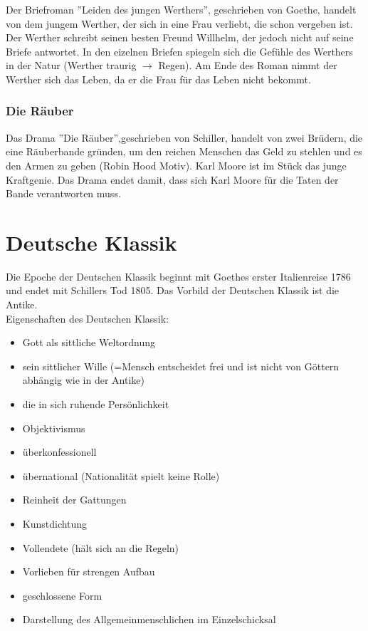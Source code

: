 \documentclass[12pt,a4paper]{article}
\begin{document}
Der Briefroman ''Leiden des jungen Werthers'', geschrieben von Goethe, handelt von dem jungem Werther, der sich in eine Frau verliebt, die schon vergeben ist. Der Werther schreibt seinen besten Freund Willhelm, der jedoch nicht auf seine Briefe antwortet. In den eizelnen Briefen spiegeln sich die Gefühle des Werthers in der Natur (Werther traurig $\rightarrow$ Regen). Am Ende des Roman nimmt der Werther sich das Leben, da er die Frau für das Leben nicht bekommt.

\subsubsection{Die Räuber}

Das Drama ''Die Räuber'',geschrieben von Schiller, handelt von zwei Brüdern, die eine Räuberbande gründen, um den reichen Menschen das Geld zu stehlen und es den Armen zu geben (Robin Hood Motiv). Karl Moore ist im Stück das junge Kraftgenie. Das Drama endet damit, dass sich Karl Moore für die Taten der Bande verantworten muss.

\newpage

\section{Deutsche Klassik}

Die Epoche der Deutschen Klassik beginnt mit Goethes erster Italienreise 1786 und endet mit Schillers Tod 1805. Das Vorbild der
Deutschen Klassik ist die Antike.\\

Eigenschaften des Deutschen Klassik:

\begin{itemize}
\item Gott als sittliche Weltordnung
\item sein sittlicher Wille (=Mensch entscheidet frei und ist nicht von Göttern abhängig wie in der Antike)
\item die in sich ruhende Persönlichkeit
\item Objektivismus
\item überkonfessionell
\item übernational (Nationalität spielt keine Rolle)
\item Reinheit der Gattungen
\item Kunstdichtung
\item Vollendete (hält sich an die Regeln)
\item Vorlieben für strengen Aufbau
\item geschlossene Form
\item Darstellung des Allgemeinmenschlichen im Einzelschicksal
\end{itemize}
\end{document}
